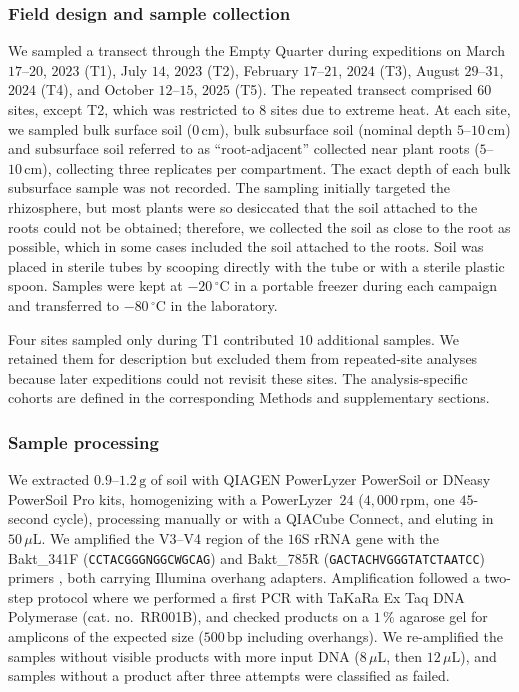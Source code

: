 \documentclass[fleqn,10pt,numbers]{olplainarticle}
\begin{document}
\subsubsection*{Field design and sample collection}
We sampled a transect through the Empty Quarter during
expeditions on March $17$--$20$, $2023$ (T1), July $14$, $2023$ (T2),
February $17$--$21$, $2024$ (T3), August $29$--$31$, $2024$ (T4), and
October $12$--$15$, $2025$ (T5). The repeated transect comprised $60$ sites, except T2, which was restricted to $8$ sites due to extreme heat. At each site, we sampled bulk surface soil ($0\,\mathrm{cm}$), bulk subsurface soil
(nominal depth $5$--$10\,\mathrm{cm}$) and subsurface soil referred to as ``root-adjacent'' collected near plant roots ($5$--$10\,\mathrm{cm}$), collecting three replicates per compartment. The exact depth of each bulk subsurface sample was not recorded. The sampling initially targeted the
rhizosphere, but most plants were so desiccated that the soil attached to the roots could
not be obtained; therefore, we collected the soil as close to the root as possible,
which in some cases included the soil attached to the roots. Soil was placed in sterile tubes by
scooping directly with the tube or with a sterile plastic spoon. Samples were
kept at $-20\,^{\circ}\mathrm{C}$ in a portable freezer during each campaign
and transferred to $-80\,^{\circ}\mathrm{C}$ in the laboratory.

Four sites sampled only during T1 contributed $10$ additional
samples. We retained them for description but excluded them from repeated-site
analyses because later expeditions could not revisit these sites. The analysis-specific cohorts are defined in the corresponding Methods and supplementary sections.

\subsubsection*{Sample processing}\label{sampleprocessing}
We extracted $0.9$--$1.2\,\mathrm{g}$ of soil with QIAGEN PowerLyzer PowerSoil or DNeasy PowerSoil Pro kits, homogenizing with a PowerLyzer~$24$ ($4{,}000\,\mathrm{rpm}$, one $45$-second cycle), processing manually or with a QIACube Connect, and eluting in $50\,\mu\mathrm{L}$. We amplified the V3--V4 region of the $16$S rRNA gene with the Bakt\_341F (\texttt{CCTACGGGNGGCWGCAG}) and Bakt\_785R (\texttt{GACTACHVGGGTATCTAATCC}) primers \cite{klindworth2013primers}, both carrying Illumina overhang adapters. Amplification followed a two-step protocol \cite{illumina16S} where we performed a first PCR with TaKaRa Ex Taq DNA Polymerase (cat. no.\ RR001B), and checked products on a $1\,\%$ agarose gel for amplicons of the expected size ($500\,\mathrm{bp}$ including overhangs). We re-amplified the samples without visible products with more input DNA ($8\,\mu\mathrm{L}$, then $12\,\mu\mathrm{L}$), and samples without a product after three attempts were classified as failed.
\end{document}
